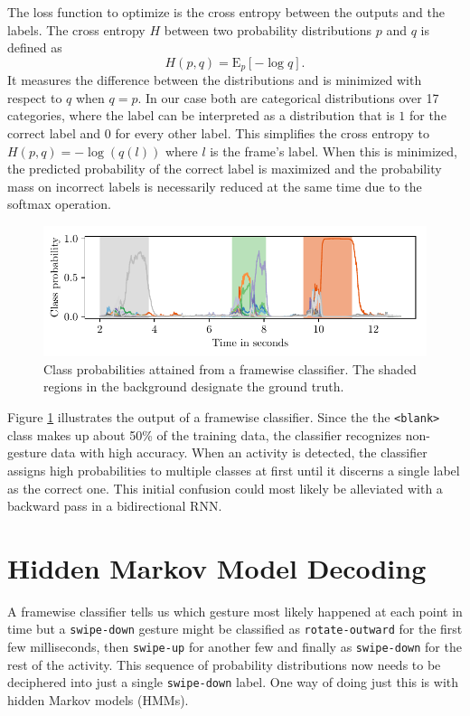The loss function to optimize is the cross entropy between the outputs and the
labels. The cross entropy $H$ between two probability distributions $p$ and $q$
is defined as
\begin{equation*}
  H(p, q) = \mathrm{E}_{p} \left[ -\log q \right].
\end{equation*}
It measures the difference between the distributions and is minimized with
respect to $q$ when $q = p$. In our case both are categorical distributions over
17 categories, where the label can be interpreted as a distribution that is $1$
for the correct label and $0$ for every other label. This simplifies the cross
entropy to $H(p, q) = -\log(q(l))$ where $l$ is the frame's label. When this is
minimized, the predicted probability of the correct label is maximized and the
probability mass on incorrect labels is necessarily reduced at the same time due
to the softmax operation.

\begin{figure}[h]
  \centering
  \includegraphics{figures/methods/framewise}
  \caption{Class probabilities attained from a framewise classifier. The shaded
    regions in the background designate the ground truth.}
  \label{fig:framewise-p}
\end{figure}

Figure \ref{fig:framewise-p} illustrates the output of a framewise classifier.
Since the the \texttt{<blank>} class makes up about 50\% of the training data,
the classifier recognizes non-gesture data with high accuracy. When an activity
is detected, the classifier assigns high probabilities to multiple classes at
first until it discerns a single label as the correct one. This initial
confusion could most likely be alleviated with a backward pass in a
bidirectional RNN.

\section{Hidden Markov Model Decoding}
\label{sec:hmm}

A framewise classifier tells us which gesture most likely happened at each point
in time but a \texttt{swipe-down} gesture might be classified as
\texttt{rotate-outward} for the first few milliseconds, then \texttt{swipe-up}
for another few and finally as \texttt{swipe-down} for the rest of the activity.
This sequence of probability distributions now needs to be deciphered into just
a single \texttt{swipe-down} label. One way of doing just this is with hidden
Markov models (HMMs).

